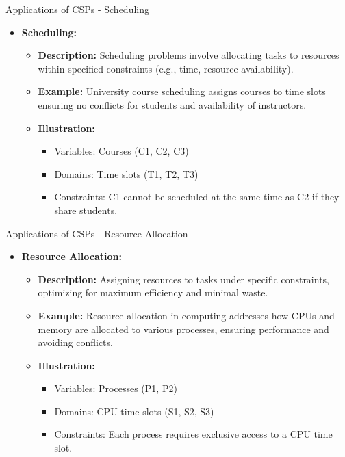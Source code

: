 \documentclass[aspectratio=169]{beamer}
\begin{document}
\begin{frame}[fragile]{Applications of CSPs - Scheduling}
    \begin{itemize}
        \item \textbf{Scheduling:}
        \begin{itemize}
            \item \textbf{Description:} Scheduling problems involve allocating tasks to resources within specified constraints (e.g., time, resource availability).
            \item \textbf{Example:} 
                University course scheduling assigns courses to time slots ensuring no conflicts for students and availability of instructors.
            \item \textbf{Illustration:}
            \begin{itemize}
                \item Variables: Courses (C1, C2, C3)
                \item Domains: Time slots (T1, T2, T3)
                \item Constraints: C1 cannot be scheduled at the same time as C2 if they share students.
            \end{itemize}
        \end{itemize}
    \end{itemize}
\end{frame}

\begin{frame}[fragile]{Applications of CSPs - Resource Allocation}
    \begin{itemize}
        \item \textbf{Resource Allocation:}
        \begin{itemize}
            \item \textbf{Description:} Assigning resources to tasks under specific constraints, optimizing for maximum efficiency and minimal waste.
            \item \textbf{Example:} 
                Resource allocation in computing addresses how CPUs and memory are allocated to various processes, ensuring performance and avoiding conflicts.
            \item \textbf{Illustration:}
            \begin{itemize}
                \item Variables: Processes (P1, P2)
                \item Domains: CPU time slots (S1, S2, S3)
                \item Constraints: Each process requires exclusive access to a CPU time slot.
            \end{itemize}
        \end{itemize}
    \end{itemize}
\end{frame}
\end{document}
